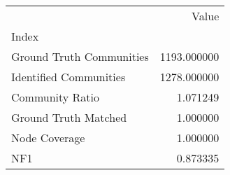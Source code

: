 \begin{tabular}{lr}
\toprule
{} &        Value \\
Index                    &              \\
\midrule
Ground Truth Communities &  1193.000000 \\
Identified Communities   &  1278.000000 \\
Community Ratio          &     1.071249 \\
Ground Truth Matched     &     1.000000 \\
Node Coverage            &     1.000000 \\
NF1                      &     0.873335 \\
\bottomrule
\end{tabular}
